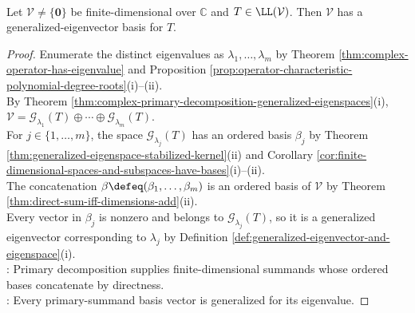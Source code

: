 \begin{corollary} \label{cor:complex-basis-of-generalized-eigenvectors} \\
Let $\mathcal{V}\neq\{\mathbf{0}\}$ be finite-dimensional over $\mathbb{C}$ and $T\in\LL(\mathcal{V})$. Then $\mathcal{V}$ has a generalized-eigenvector basis for $T$.
\begin{proof}
Enumerate the distinct eigenvalues as $\lambda_1,\ldots,\lambda_m$ by Theorem \ref{thm:complex-operator-has-eigenvalue} and Proposition \ref{prop:operator-characteristic-polynomial-degree-roots}(i)--(ii).\\
By Theorem \ref{thm:complex-primary-decomposition-generalized-eigenspaces}(i), $\mathcal{V}=\mathcal{G}_{\lambda_1}(T)\oplus\cdots\oplus\mathcal{G}_{\lambda_m}(T)$.\\
For $j\in\{1,\ldots,m\}$, the space $\mathcal{G}_{\lambda_j}(T)$ has an ordered basis $\beta_j$ by Theorem \ref{thm:generalized-eigenspace-stabilized-kernel}(ii) and Corollary \ref{cor:finite-dimensional-spaces-and-subspaces-have-bases}(i)--(ii).\\
The concatenation $\beta\defeq(\beta_1,\ldots,\beta_m)$ is an ordered basis of $\mathcal{V}$ by Theorem \ref{thm:direct-sum-iff-dimensions-add}(ii).\\
Every vector in $\beta_j$ is nonzero and belongs to $\mathcal{G}_{\lambda_j}(T)$, so it is a generalized eigenvector corresponding to $\lambda_j$ by Definition \ref{def:generalized-eigenvector-and-eigenspace}(i).\\
: Primary decomposition supplies finite-dimensional summands whose ordered bases concatenate by directness.\\
: Every primary-summand basis vector is generalized for its eigenvalue.
\end{proof}
\end{corollary}

